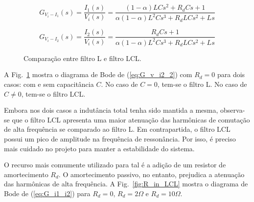     \begin{equation}
        G_{V_i-I_1}(s) = \frac{I_1(s)}{V_i(s)} = \frac{(1-\alpha)LCs^2+R_dCs+1}{\alpha(1-\alpha)L^2Cs^3+R_dLCs^2+Ls}
    \end{equation}

    \begin{equation}
        G_{V_i-I_2}(s) = \frac{I_2(s)}{V_i(s)} = \frac{R_dCs+1}{\alpha(1-\alpha)L^2Cs^3+R_dLCs^2+Ls}
        \label{eq:G_v_i2_2}
    \end{equation}

    \begin{figure}[htb]
        \caption{Comparação entre filtro L e filtro LCL.}
        \label{fig:L_vs_LCL}
    \end{figure}

    A Fig.~\ref{fig:L_vs_LCL} mostra o diagrama de Bode de (\ref{eq:G_v_i2_2})
    com $R_d = 0$ para dois casos: com e sem capacitância $C$. No caso de $C = 0$,
    tem-se o filtro L. No caso de $C \neq 0$, tem-se o filtro LCL.

    Embora nos dois casos a indutância total tenha sido mantida a mesma, observa-se
    que o filtro LCL apresenta uma maior atenuação das harmônicas de comutação
    de alta frequência se comparado ao filtro L. Em contrapartida, o filtro LCL
    possui um pico de amplitude na frequência de ressonância. Por isso, é preciso
    mais cuidado no projeto para manter a estabilidade do sistema.

    O recurso mais comumente utilizado para tal é a adição de um resistor de
    amortecimento $R_d$. O amortecimento passivo, no entanto, prejudica a atenuação
    das harmônicas de alta frequência. A Fig.~\ref{fig:R_in_LCL} mostra o diagrama
    de Bode de (\ref{eq:G_i1_i2}) para $R_d = 0$, $R_d = 2\Omega$ e $R_d = 10\Omega$.


